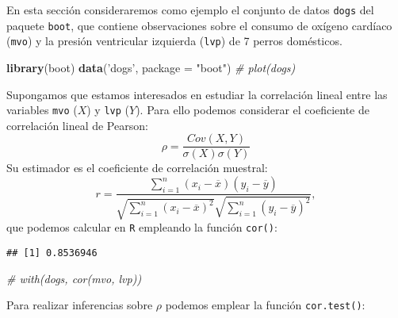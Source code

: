 \documentclass[]{book}
\newenvironment{Shaded}{\begin{snugshade}}{\end{snugshade}}
\newcommand{\KeywordTok}[1]{\textcolor[rgb]{0.13,0.29,0.53}{\textbf{#1}}}
\newcommand{\DataTypeTok}[1]{\textcolor[rgb]{0.13,0.29,0.53}{#1}}
\newcommand{\StringTok}[1]{\textcolor[rgb]{0.31,0.60,0.02}{#1}}
\newcommand{\CommentTok}[1]{\textcolor[rgb]{0.56,0.35,0.01}{\textit{#1}}}
\newcommand{\OperatorTok}[1]{\textcolor[rgb]{0.81,0.36,0.00}{\textbf{#1}}}
\newcommand{\NormalTok}[1]{#1}
\theoremstyle{break}
\theoremstyle{definition}
\theoremstyle{definition}
\theoremstyle{definition}
\theoremstyle{remark}
\begin{document}
En esta sección consideraremos como ejemplo el conjunto de datos
\texttt{dogs} del paquete \texttt{boot}, que contiene observaciones
sobre el consumo de oxígeno cardíaco (\texttt{mvo}) y la presión
ventricular izquierda (\texttt{lvp}) de 7 perros domésticos.

\begin{Shaded}
\begin{Highlighting}[]
\KeywordTok{library}\NormalTok{(boot)}
\KeywordTok{data}\NormalTok{(}\StringTok{'dogs'}\NormalTok{, }\DataTypeTok{package =} \StringTok{"boot"}\NormalTok{)}
\CommentTok{# plot(dogs)}
\end{Highlighting}
\end{Shaded}

Supongamos que estamos interesados en estudiar la correlación lineal
entre las variables \texttt{mvo} (\(X\)) y \texttt{lvp} (\(Y\)). Para
ello podemos considerar el coeficiente de correlación lineal de Pearson:
\[\rho =\frac{ Cov \left( X, Y \right) }
{ \sigma \left( X \right) \sigma \left( Y \right) }\] Su estimador es el
coeficiente de correlación muestral:
\[r=\frac{\sum_{i=1}^{n}(x_i-\overline{x})(y_i-\overline{y})}
{\sqrt{ \sum_{i=1}^{n}(x_i-\overline{x})^{2}} 
\sqrt{\sum_{i=1}^{n}(y_i-\overline{y})^{2}}},\] que podemos calcular en
\texttt{R} empleando la función \texttt{cor()}:

\begin{Shaded}
\end{Shaded}

\begin{verbatim}
## [1] 0.8536946
\end{verbatim}

\begin{Shaded}
\begin{Highlighting}[]
\CommentTok{# with(dogs, cor(mvo, lvp))}
\end{Highlighting}
\end{Shaded}

Para realizar inferencias sobre \(\rho\) podemos emplear la función
\texttt{cor.test()}:

\begin{Shaded}
\end{Shaded}
\end{document}
